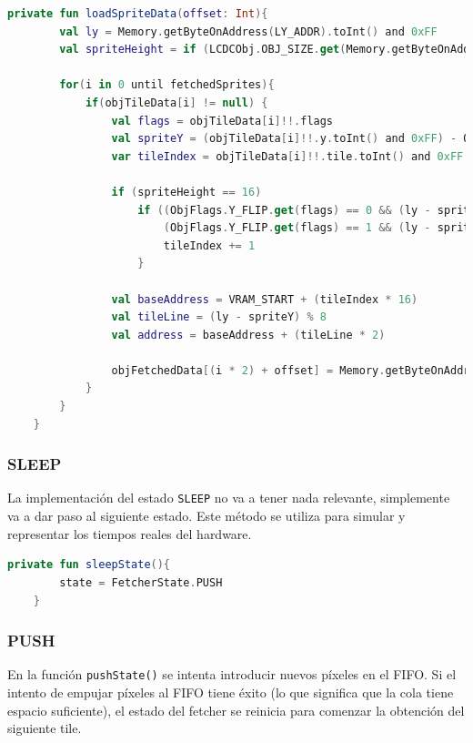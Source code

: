\begin{lstlisting}[language=Kotlin, caption={FIFO Fetcher - Obtención de Información de un Sprite en la Línea Actual.}, label={code:ppufifogethighlowdatasprite}]
    private fun loadSpriteData(offset: Int){
        val ly = Memory.getByteOnAddress(LY_ADDR).toInt() and 0xFF
        val spriteHeight = if (LCDCObj.OBJ_SIZE.get(Memory.getByteOnAddress(LCDC_ADDR)) == 1) 16 else 8

        for(i in 0 until fetchedSprites){
            if(objTileData[i] != null) {
                val flags = objTileData[i]!!.flags
                val spriteY = (objTileData[i]!!.y.toInt() and 0xFF) - OAM_Y_OFFSET
                var tileIndex = objTileData[i]!!.tile.toInt() and 0xFF

                if (spriteHeight == 16)
                    if ((ObjFlags.Y_FLIP.get(flags) == 0 && (ly - spriteY) >= 8) ||
                        (ObjFlags.Y_FLIP.get(flags) == 1 && (ly - spriteY) < 8)) {
                        tileIndex += 1
                    }

                val baseAddress = VRAM_START + (tileIndex * 16)
                val tileLine = (ly - spriteY) % 8
                val address = baseAddress + (tileLine * 2)

                objFetchedData[(i * 2) + offset] = Memory.getByteOnAddress(address + offset)
            }
        }
    }
\end{lstlisting}

\subsubsection{SLEEP}
La implementación del estado \texttt{SLEEP} no va a tener nada relevante, simplemente va a dar paso al siguiente estado. Este método se utiliza para simular y representar los tiempos reales del hardware.

\begin{lstlisting}[language=Kotlin, caption={FIFO Fetcher - Sleep.}, label={code:ppufifosleep}]
    private fun sleepState(){
        state = FetcherState.PUSH
    }
\end{lstlisting}

\subsubsection{PUSH}

En la función \texttt{pushState()} se intenta introducir nuevos píxeles en el FIFO. Si el intento de empujar píxeles al FIFO tiene éxito (lo que significa que la cola tiene espacio suficiente), el estado del fetcher se reinicia para comenzar la obtención del siguiente tile.

